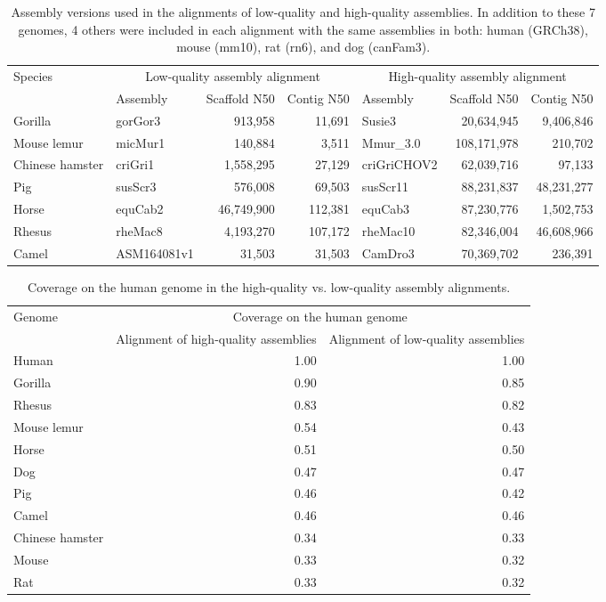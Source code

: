 \documentclass{article}
\begin{document}
\begin{table}
\begin{center}
    \begin{tabular}{l|l|r|r|l|r|r}
    \multirow{2}{*}{Species}	& \multicolumn{3}{c}{Low-quality assembly alignment} & \multicolumn{3}{c}{High-quality assembly alignment} \\
    \cmidrule{2-4} \cmidrule{5-7}
    & Assembly & Scaffold N50 & Contig N50 & Assembly &	Scaffold N50 & Contig N50 \\
    \midrule
Gorilla	& gorGor3 & 913,958&	11,691&	Susie3&	20,634,945&	9,406,846 \\
Mouse lemur&	micMur1&	140,884&	3,511&	Mmur\_3.0&	108,171,978&	210,702 \\
Chinese hamster&	criGri1&	1,558,295&	27,129&	criGriCHOV2&	62,039,716&	97,133 \\
Pig&	susScr3&	576,008&	69,503&	susScr11&	88,231,837&	48,231,277 \\
Horse&	equCab2&	46,749,900&	112,381&	equCab3&	87,230,776&	1,502,753 \\
Rhesus&	rheMac8&	4,193,270&	107,172&	rheMac10&	82,346,004& 	46,608,966 \\
Camel&	ASM164081v1&	31,503&	31,503&	CamDro3&	70,369,702&	236,391 \\
\end{tabular}
\caption{Assembly versions used in the alignments of low-quality and high-quality assemblies. In addition to these 7 genomes, 4 others were included in each alignment with the same assemblies in both: human (GRCh38), mouse (mm10), rat (rn6), and dog (canFam3).}\label{tab:assembly_quality_comparison_assemblies}
\end{center}
\end{table}

\begin{table}[ht]
\centering
\begin{tabular}{l|r|r}
\multirow{2}{*}{Genome} & \multicolumn{2}{c}{Coverage on the human genome} \\
\cmidrule{2-3}
 & Alignment of high-quality assemblies & Alignment of low-quality assemblies \\ 
\midrule
Human & 1.00 & 1.00 \\ 
Gorilla & 0.90 & 0.85 \\ 
Rhesus & 0.83 & 0.82 \\ 
Mouse lemur & 0.54 & 0.43 \\
Horse & 0.51 & 0.50 \\ 
Dog & 0.47 & 0.47 \\ 
Pig & 0.46 & 0.42 \\ 
Camel & 0.46 & 0.46 \\ 
Chinese hamster & 0.34 & 0.33 \\ 
Mouse & 0.33 & 0.32 \\ 
Rat & 0.33 & 0.32 \\ 
\end{tabular}
\caption{Coverage on the human genome in the high-quality vs. low-quality assembly alignments.}\label{tab:new_vs_old_assemblies_coverage}
\end{table}
\end{document}
